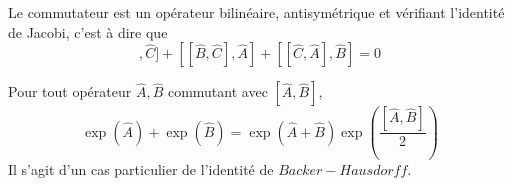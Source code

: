 \documentclass[../Notesdecours.tex]{subfiles}
\begin{document}
\begin{Property}
	Le commutateur est un opérateur bilinéaire, antisymétrique et vérifiant l'identité de Jacobi, c'est à dire que
	\begin{equation}
		[[\hat{A},\hat{B}],\hat{C}] + [[\hat{B},\hat{C}],\hat{A}] + [[\hat{C},\hat{A}],\hat{B}] = 0
	\end{equation}
\end{Property}

\begin{Property}
	Pour tout opérateur $\hat{A},\hat{B}$ commutant avec $[\hat{A},\hat{B}]$, 
	\begin{equation}
		\exp\left(\hat{A}\right)+\exp\left(\hat{B}\right) = \exp\left(\hat{A}+\hat{B}\right)\exp\left(\frac{[\hat{A},\hat{B}]}{2}\right)
	\end{equation}
	Il s'agit d'un cas particulier de l'identité de $Backer-Hausdorff$.
\end{Property}
\end{document}

